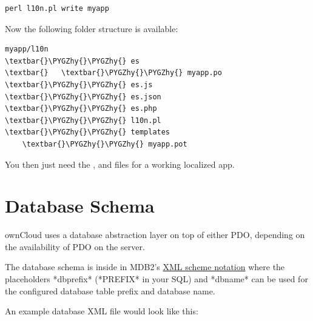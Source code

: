 \documentclass[letterpaper,10pt,english]{sphinxmanual}
\def\PYGZhy{\char`\-}
\begin{document}
\begin{Verbatim}[commandchars=\\\{\}]
perl l10n.pl write myapp
\end{Verbatim}

Now the following folder structure is available:

\begin{Verbatim}[commandchars=\\\{\}]
myapp/l10n
\textbar{}\PYGZhy{}\PYGZhy{} es
\textbar{}   \textbar{}\PYGZhy{}\PYGZhy{} myapp.po
\textbar{}\PYGZhy{}\PYGZhy{} es.js
\textbar{}\PYGZhy{}\PYGZhy{} es.json
\textbar{}\PYGZhy{}\PYGZhy{} es.php
\textbar{}\PYGZhy{}\PYGZhy{} l10n.pl
\textbar{}\PYGZhy{}\PYGZhy{} templates
    \textbar{}\PYGZhy{}\PYGZhy{} myapp.pot
\end{Verbatim}

You then just need the ,  and  files for a
working localized app.


\section{Database Schema}
\label{app/schema::doc}\label{app/schema:database-schema}
ownCloud uses a database abstraction layer on top of either PDO, depending on the availability of PDO on the server.

The database schema is inside  in MDB2's \href{http://www.wiltonhotel.com/\_ext/pear/docs/MDB2/docs/xml\_schema\_documentation.html}{XML scheme notation} where the placeholders *dbprefix* (*PREFIX* in your SQL) and *dbname* can be used for the configured database table prefix and database name.

An example database XML file would look like this:
\end{document}
